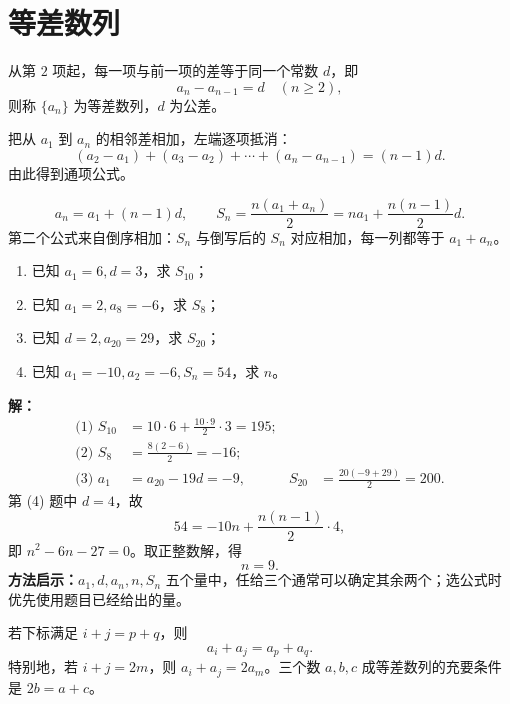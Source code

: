 \section{等差数列}

\begin{definitionbox}[等差数列]
  从第 $2$ 项起，每一项与前一项的差等于同一个常数 $d$，即
  \[
    a_n-a_{n-1}=d\quad(n\ge2),
  \]
  则称 $\{a_n\}$ 为等差数列，$d$ 为公差。
\end{definitionbox}

把从 $a_1$ 到 $a_n$ 的相邻差相加，左端逐项抵消：
\[
  (a_2-a_1)+(a_3-a_2)+\cdots+(a_n-a_{n-1})=(n-1)d.
\]
由此得到通项公式。

\begin{lawbox}[等差数列的通项与前 $n$ 项和]
  \[
    a_n=a_1+(n-1)d,
    \qquad
    S_n=\frac{n(a_1+a_n)}2
       =na_1+\frac{n(n-1)}2d.
  \]
  第二个公式来自倒序相加：$S_n$ 与倒写后的 $S_n$ 对应相加，每一列都等于 $a_1+a_n$。
\end{lawbox}

\begin{examplebox}
  \begin{enumerate}
    \item 已知 $a_1=6,d=3$，求 $S_{10}$；
    \item 已知 $a_1=2,a_8=-6$，求 $S_8$；
    \item 已知 $d=2,a_{20}=29$，求 $S_{20}$；
    \item 已知 $a_1=-10,a_2=-6,S_n=54$，求 $n$。
  \end{enumerate}

  \textbf{解：}
  \begin{align*}
    \text{(1) }S_{10}&=10\cdot6+\frac{10\cdot9}{2}\cdot3=195;\\
    \text{(2) }S_8&=\frac{8(2-6)}2=-16;\\
    \text{(3) }a_1&=a_{20}-19d=-9,
      &S_{20}&=\frac{20(-9+29)}2=200.
  \end{align*}
  第 (4) 题中 $d=4$，故
  \[
    54=-10n+\frac{n(n-1)}2\cdot4,
  \]
  即 $n^2-6n-27=0$。取正整数解，得
  \[
    \boxed{n=9}.
  \]
  \textbf{方法启示：}$a_1,d,a_n,n,S_n$ 五个量中，任给三个通常可以确定其余两个；选公式时优先使用题目已经给出的量。
\end{examplebox}

\begin{corollarybox}[等差数列的对称性]
  若下标满足 $i+j=p+q$，则
  \[
    a_i+a_j=a_p+a_q.
  \]
  特别地，若 $i+j=2m$，则 $a_i+a_j=2a_m$。三个数 $a,b,c$ 成等差数列的充要条件是 $2b=a+c$。
\end{corollarybox}

